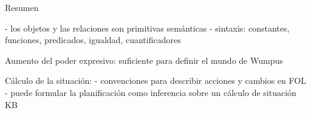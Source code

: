 \begin{frame}{Resumen}
    
    \quad - los objetos y las relaciones son primitivas semánticas
    \quad - sintaxis: constantes, funciones, predicados, igualdad, cuantificadores
    \bigskip
    
    Aumento del poder expresivo: suficiente para definir el mundo de Wumpus
    \bigskip
    
    Cálculo de la situación:
    \quad - convenciones para describir acciones y cambios en FOL
    \quad - puede formular la planificación como inferencia sobre un cálculo de situación KB

    
\end{frame}